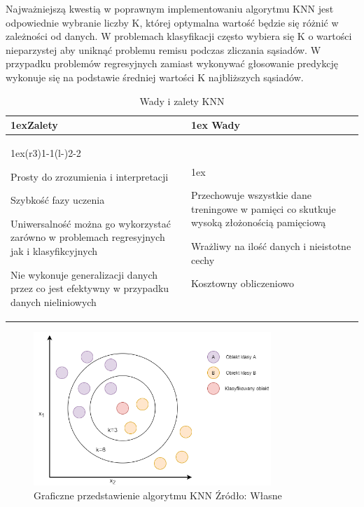 Najważniejszą kwestią w poprawnym implementowaniu algorytmu KNN jest odpowiednie wybranie liczby
K, której optymalna wartość będzie się różnić w zależności od danych. W problemach 
klasyfikacji często wybiera się K o wartości nieparzystej aby uniknąć problemu remisu
podczas zliczania sąsiadów. W przypadku problemów regresyjnych zamiast wykonywać głosowanie
predykcję wykonuje się na podstawie średniej wartości K najbliższych sąsiadów.

\begin{table}[h]
    \begin{tabularx}{\linewidth}{>{\parskip1ex}X@{\kern4\tabcolsep}>{\parskip1ex}X}
    \toprule
    \hfil\bfseries Zalety
    &
    \hfil\bfseries Wady
    \\\cmidrule(r{3\tabcolsep}){1-1}\cmidrule(l{-\tabcolsep}){2-2}
    
    Prosty do zrozumienia i interpretacji\par
    Szybkość fazy uczenia\par
    Uniwersalność można go wykorzystać zarówno w problemach regresyjnych jak i klasyfikcyjnych\par
    Nie wykonuje generalizacji danych przez co jest efektywny w przypadku danych nieliniowych\par
    &
    
    Przechowuje wszystkie dane treningowe w pamięci co skutkuje wysoką złożonością pamięciową\par
    Wrażliwy na ilość danych i nieistotne cechy\par
    Kosztowny obliczeniowo\par
    \\\bottomrule
    \end{tabularx}
    \caption{Wady i zalety KNN}
\end{table}
    

\begin{figure}[h]
    \centering
    \includegraphics[width=0.8\textwidth]{./Img/KNN.png}
    \caption{Graficzne przedstawienie algorytmu KNN Źródło: Własne}
\end{figure}

